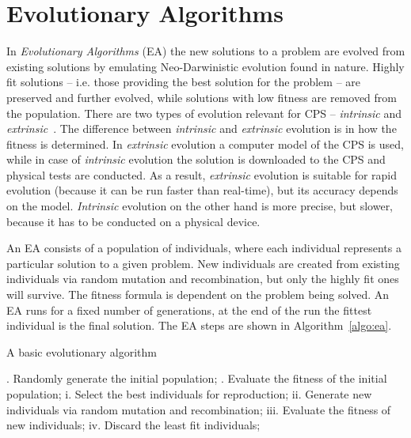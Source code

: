 \section{Evolutionary Algorithms}
\label{sec:EA}
In \textit{Evolutionary Algorithms} (EA) the new solutions to a problem are evolved from existing solutions by emulating Neo-Darwinistic evolution found in nature. Highly fit solutions -- i.e. those providing the best solution for the problem -- are preserved and further evolved, while solutions with low fitness are removed from the population. There are two types of evolution  relevant for CPS -- \textit{intrinsic} and \textit{extrinsic}~\cite{Greenwood2015}. The difference between \textit{intrinsic} and \textit{extrinsic} evolution is in how the fitness is determined. In \textit{extrinsic} evolution a computer model of the CPS is used, while in case of \textit{intrinsic} evolution the solution is downloaded to the CPS and physical tests are conducted. As a result, \textit{extrinsic} evolution is suitable for rapid evolution (because it can be run faster than real-time), but its accuracy depends on the model. \textit{Intrinsic} evolution on the other hand is more precise, but slower, because it has to be conducted on a physical device. 

An EA consists of a population of individuals, where each individual represents a particular solution to a given problem. New individuals are created from existing individuals via random mutation and recombination, but only the highly fit ones will survive. The fitness formula is dependent on the problem being solved. An EA runs for a fixed number of generations, at the end of the run the fittest individual is the final solution. The EA steps are shown in Algorithm~\ref{algo:ea}.
 
\begin{algorithm}
\caption{A basic evolutionary algorithm}
\label{algo:ea}
\begin{algorithmic}                    %
. Randomly generate the initial population;
. Evaluate the fitness of the initial population;
\STATE i. Select the best individuals for reproduction;
\STATE ii. Generate new individuals via random mutation and recombination;
\STATE iii. Evaluate the fitness of new individuals;
\STATE iv. Discard the least fit individuals;
\ENDWHILE
\end{algorithmic}
\end{algorithm}


